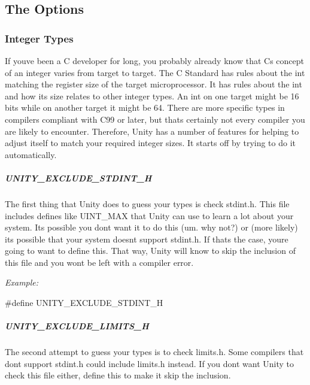 \subsection*{The Options}

\subsubsection*{Integer Types}

If you\textquotesingle{}ve been a C developer for long, you probably already know that C\textquotesingle{}s concept of an integer varies from target to target. The C Standard has rules about the {\ttfamily int} matching the register size of the target microprocessor. It has rules about the {\ttfamily int} and how its size relates to other integer types. An {\ttfamily int} on one target might be 16 bits while on another target it might be 64. There are more specific types in compilers compliant with C99 or later, but that\textquotesingle{}s certainly not every compiler you are likely to encounter. Therefore, Unity has a number of features for helping to adjust itself to match your required integer sizes. It starts off by trying to do it automatically.

\subparagraph*{{\ttfamily U\+N\+I\+T\+Y\+\_\+\+E\+X\+C\+L\+U\+D\+E\+\_\+\+S\+T\+D\+I\+N\+T\+\_\+H}}

The first thing that Unity does to guess your types is check {\ttfamily stdint.\+h}. This file includes defines like {\ttfamily U\+I\+N\+T\+\_\+\+M\+AX} that Unity can use to learn a lot about your system. It\textquotesingle{}s possible you don\textquotesingle{}t want it to do this (um. why not?) or (more likely) it\textquotesingle{}s possible that your system doesn\textquotesingle{}t support {\ttfamily stdint.\+h}. If that\textquotesingle{}s the case, you\textquotesingle{}re going to want to define this. That way, Unity will know to skip the inclusion of this file and you won\textquotesingle{}t be left with a compiler error.

{\itshape Example\+:} 
\begin{DoxyCode}
\textcolor{preprocessor}{#define UNITY\_EXCLUDE\_STDINT\_H}
\end{DoxyCode}


\subparagraph*{{\ttfamily U\+N\+I\+T\+Y\+\_\+\+E\+X\+C\+L\+U\+D\+E\+\_\+\+L\+I\+M\+I\+T\+S\+\_\+H}}

The second attempt to guess your types is to check {\ttfamily limits.\+h}. Some compilers that don\textquotesingle{}t support {\ttfamily stdint.\+h} could include {\ttfamily limits.\+h} instead. If you don\textquotesingle{}t want Unity to check this file either, define this to make it skip the inclusion.

